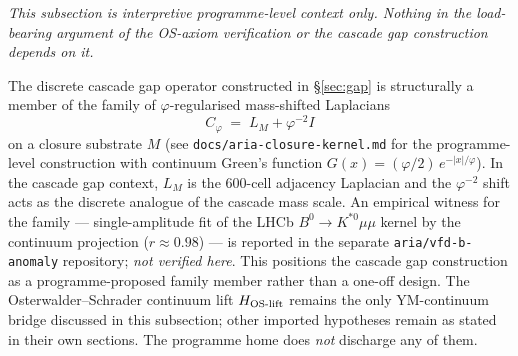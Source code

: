 \documentclass[11pt, a4paper]{amsart}
\theoremstyle{definition}
\begin{document}
\emph{This subsection is interpretive programme-level context only.
Nothing in the load-bearing argument of the OS-axiom verification
or the cascade gap construction depends on it.}\medskip

The discrete cascade gap operator constructed in \S\ref{sec:gap}
is structurally a member of the family of $\varphi$-regularised
mass-shifted Laplacians
\[
C_\varphi \;=\; L_M + \varphi^{-2} I
\]
on a closure substrate $M$ (see
\texttt{docs/aria-closure-kernel.md} for the programme-level
construction with continuum Green's function
$G(x) = (\varphi/2)\, e^{-|x|/\varphi}$).  In the cascade gap
context, $L_M$ is the 600-cell adjacency Laplacian and the
$\varphi^{-2}$ shift acts as the discrete analogue of the cascade
mass scale.  An empirical witness for the family --- single-amplitude fit of
the LHCb $B^0\to K^{*0}\mu\mu$ kernel by the continuum projection
($r \approx 0.98$) --- is reported in the separate
\texttt{aria/vfd-b-anomaly} repository; \emph{not verified here}.
This positions the cascade gap construction as a programme-proposed
family member rather than a one-off design.  The
Osterwalder--Schrader continuum lift $H_{\rm OS\text{-}lift}$
remains the only YM-continuum bridge discussed in this subsection;
other imported hypotheses remain as stated in their own
sections.  The programme home does \emph{not} discharge any of
them.
\end{document}
